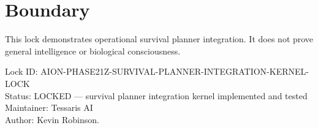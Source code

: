 \documentclass[11pt,a4paper]{article}
\begin{document}
\section{Boundary}

This lock demonstrates operational survival planner integration. It does not prove general intelligence or biological consciousness.

\bigskip

\noindent
Lock ID: AION-PHASE21Z-SURVIVAL-PLANNER-INTEGRATION-KERNEL-LOCK\\
Status: LOCKED --- survival planner integration kernel implemented and tested\\
Maintainer: Tessaris AI\\
Author: Kevin Robinson.
\end{document}
